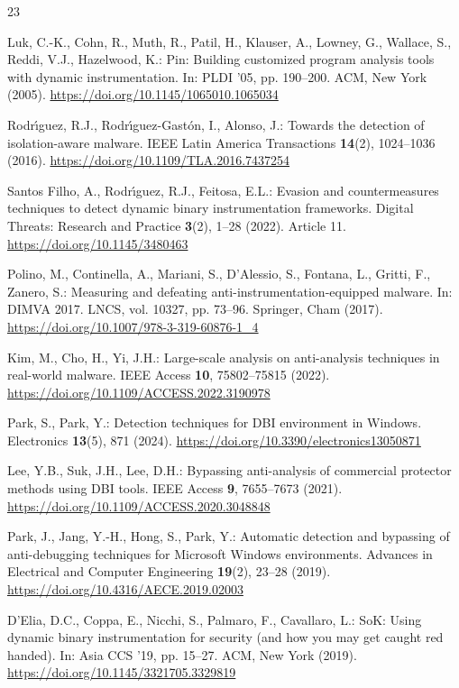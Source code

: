 \documentclass[pdflatex,sn-mathphys-num]{sn-jnl}
\theoremstyle{thmstyleone}
\theoremstyle{thmstyletwo}
\theoremstyle{thmstylethree}
\begin{document}
\providecommand{\doi}[1]{\url{https://doi.org/#1}}
\begin{thebibliography}{23}

Luk, C.-K., Cohn, R., Muth, R., Patil, H., Klauser, A., Lowney, G., Wallace, S., Reddi, V.J., Hazelwood, K.:
Pin: Building customized program analysis tools with dynamic instrumentation.
In: PLDI '05, pp. 190--200. ACM, New York (2005).
\doi{10.1145/1065010.1065034}

Rodr\'{\i}guez, R.J., Rodr\'{\i}guez-Gast\'{o}n, I., Alonso, J.:
Towards the detection of isolation-aware malware.
IEEE Latin America Transactions \textbf{14}(2), 1024--1036 (2016).
\doi{10.1109/TLA.2016.7437254}

Santos Filho, A., Rodr\'{\i}guez, R.J., Feitosa, E.L.:
Evasion and countermeasures techniques to detect dynamic binary instrumentation frameworks.
Digital Threats: Research and Practice \textbf{3}(2), 1--28 (2022). Article 11.
\doi{10.1145/3480463}

Polino, M., Continella, A., Mariani, S., D'Alessio, S., Fontana, L., Gritti, F., Zanero, S.:
Measuring and defeating anti-instrumentation-equipped malware.
In: DIMVA 2017. LNCS, vol. 10327, pp. 73--96. Springer, Cham (2017).
\doi{10.1007/978-3-319-60876-1_4}

Kim, M., Cho, H., Yi, J.H.:
Large-scale analysis on anti-analysis techniques in real-world malware.
IEEE Access \textbf{10}, 75802--75815 (2022).
\doi{10.1109/ACCESS.2022.3190978}

Park, S., Park, Y.:
Detection techniques for DBI environment in Windows.
Electronics \textbf{13}(5), 871 (2024).
\doi{10.3390/electronics13050871}

Lee, Y.B., Suk, J.H., Lee, D.H.:
Bypassing anti-analysis of commercial protector methods using DBI tools.
IEEE Access \textbf{9}, 7655--7673 (2021).
\doi{10.1109/ACCESS.2020.3048848}

Park, J., Jang, Y.-H., Hong, S., Park, Y.:
Automatic detection and bypassing of anti-debugging techniques for Microsoft Windows environments.
Advances in Electrical and Computer Engineering \textbf{19}(2), 23--28 (2019).
\doi{10.4316/AECE.2019.02003}

D'Elia, D.C., Coppa, E., Nicchi, S., Palmaro, F., Cavallaro, L.:
SoK: Using dynamic binary instrumentation for security (and how you may get caught red handed).
In: Asia CCS '19, pp. 15--27. ACM, New York (2019).
\doi{10.1145/3321705.3329819}


\end{thebibliography}
\end{document}
